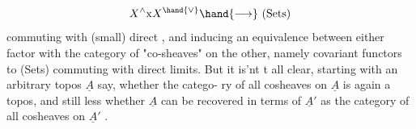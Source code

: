 
\[X^{\wedge}\mathrm{x}X^{\hand{\vee}}\hand{\longrightarrow}\ \text{(Sets)}\]
commuting with (small) direct , and inducing an equivalence between
either factor with the category of  "co-sheaves" on the other, namely
covariant functors to (Sets) commuting with direct limits. But it is'nt
t all clear, starting with an arbitrary topos $\underline{A}$ say, whether the catego-%
ry of all cosheaves on $\underline{A}$ is again a topos, and still less whether $\underline{A}$ can
be recovered in terms of $\underline{A}'$ as the category of all cosheaves on $\underline{A}'$ .

